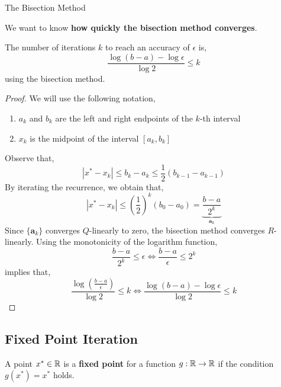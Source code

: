 \begin{algorithm}
	  \caption{The Bisection Method}\label{bisection}
\end{algorithm}

\noindent We want to know \textbf{how quickly the bisection method converges}. 

\begin{thm}
    The number of iterations $k$ to reach an accuracy of $\epsilon$ is,
    \[\frac{\log \left(b-a\right) - \log \epsilon}{\log 2} \leq k\]
    using the bisection method.
\end{thm}

\begin{proof}
We will use the following notation,
\begin{enumerate}
    \item $a_k$ and $b_k$ are the left and right endpoints of the $k$-th interval
    \item $x_k$ is the midpoint of the interval $[a_k, b_k]$
\end{enumerate}
Observe that,
\[\left|x^*-x_k\right| \leq b_k-a_k \leq \frac{1}{2}\left(b_{k-1}-a_{k-1}\right)\]
By iterating the recurrence, we obtain that,
\[\left|x^*-x_k\right| \leq \left(\frac{1}{2}\right)^k\left(b_0-a_0\right)=\underbrace{\frac{b-a}{2^k}}_{\mathbf{a}_k}\]
Since $\{\mathbf{a}_k\}$ converges $Q$-linearly to zero, the bisection method converges $R$-linearly. Using the monotonicity of the logarithm function,
\[\frac{b-a}{2^k} \leq \epsilon \iff \frac{b-a}{\epsilon} \leq 2^k\]
implies that,
\[\frac{\log \left(\frac{b-a}{\epsilon}\right)}{\log 2} \leq k \iff \frac{\log \left(b-a\right) - \log \epsilon}{\log 2} \leq k\]
\end{proof}


\subsection{Fixed Point Iteration}
\begin{defn}
    A point $x^* \in \mathbb{R}$ is a \textbf{fixed point} for a function $g: \mathbb{R} \rightarrow \mathbb{R}$ if the condition $g(x^*) = x^*$ holds.
\end{defn}


